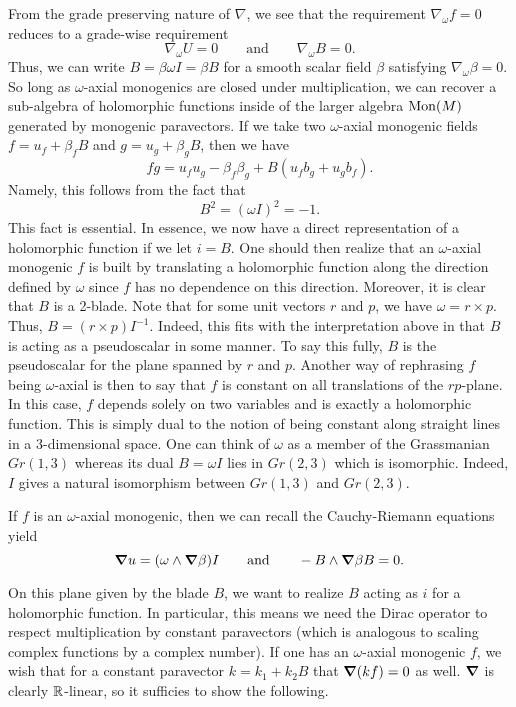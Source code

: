 \documentclass[12pt]{article}
\begin{document}
From the grade preserving nature of $\nabla$, we see that the requirement $\nabla_\omega f=0$ reduces to a grade-wise requirement
\[
\nabla_\omega U = 0 \qquad \textrm{and} \qquad \nabla_\omega B = 0.
\]
Thus, we can write $B=\beta \omega I = \beta B$ for a smooth scalar field $\beta$ satisfying $\nabla_\omega \beta =0$. So long as $\omega$-axial monogenics are closed under multiplication, we can recover a sub-algebra of holomorphic functions inside of the larger algebra $\operatorname{Mon}(M)$ generated by monogenic paravectors. If we take two $\omega$-axial monogenic fields $f=u_f + \beta_f B$ and $g=u_g + \beta_g B$, then we have
\begin{equation}
\label{eq:axial_multiplication}
fg = u_f u_g - \beta_f \beta_g + B (u_f b_g + u_g b_f).
\end{equation}
Namely, this follows from the fact that
\[
B^2 = (\omega I)^2 = -1.
\]
This fact is essential. In essence, we now have a direct representation of a holomorphic function if we let $i=B$.  One should then realize that an $\omega$-axial monogenic $f$ is built by translating a holomorphic function along the direction defined by $\omega$ since $f$ has no dependence on this direction. Moreover, it is clear that $B$ is a 2-blade.  Note that for some unit vectors $r$ and $p$, we have $\omega = r \times p$.  Thus, $B =  (r \times p)I^{-1}$.  Indeed, this fits with the interpretation above in that $B$ is acting as a pseudoscalar in some manner.  To say this fully, $B$ is the pseudoscalar for the plane spanned by $r$ and $p$. Another way of rephrasing $f$ being $\omega$-axial is then to say that $f$ is constant on all translations of the $r p$-plane. In this case, $f$ depends solely on two variables and is exactly a holomorphic function. This is simply dual to the notion of being constant along straight lines in a 3-dimensional space.  One can think of $\omega$ as a member of the Grassmanian $Gr(1,3)$ whereas its dual $B=\omega I$ lies in $Gr(2,3)$ which is isomorphic. Indeed, $I$ gives a natural isomorphism between $Gr(1,3)$ and $Gr(2,3)$.

If $f$ is an $\omega$-axial monogenic, then we can recall the Cauchy-Riemann equations yield
\begin{equation}
\label{eq:axial_cauchy_riemann}
\boldsymbol{\nabla} u = (\omega \wedge \boldsymbol{\nabla} \beta)I \qquad \textrm{and} \qquad - B \wedge \boldsymbol{\nabla} \beta B = 0.
\end{equation}

On this plane given by the blade $B$, we want to realize $B$ acting as $i$ for a holomorphic function. In particular, this means we need the Dirac operator to respect multiplication by constant paravectors (which is analogous to scaling complex functions by a complex number). If one has an $\omega$-axial monogenic $f$, we wish that for a constant paravector $k=k_1 + k_2 B$ that $\boldsymbol{\nabla} (kf)=0$ as well. $\boldsymbol{\nabla}$ is clearly $\mathbb{R}$-linear, so it sufficies to show the following.
\end{document}
